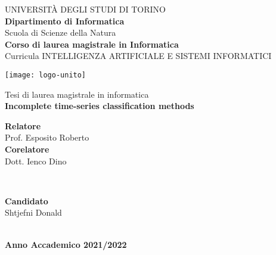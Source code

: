 \begin{titlepage}
  \begin{center}
      {\large \uppercase{Università degli studi di Torino}}\\[0.6cm]
      {\large \bf Dipartimento di Informatica}\\[0.6cm]
      {Scuola di Scienze della Natura}\\[0.6cm]
      {\large \bf Corso di laurea magistrale in Informatica}\\[0.5cm]
      {Curricula INTELLIGENZA ARTIFICIALE E SISTEMI INFORMATICI}\\[0.5cm]
      
      \vspace{0.1cm}
      \begin{center}
          \texttt{[image: logo-unito]}
      \end{center}
      \vspace{0.3cm}
      
      {Tesi di laurea magistrale in informatica}\\[1cm]
      {\huge \bf Incomplete time-series classification methods}\\[2.0cm]
      
     \begin{minipage}{0.4\textwidth}
         \begin{flushleft} \large
             \textbf{Relatore}\\
             {Prof. Esposito Roberto}\\[0.2cm]
             \textbf{Corelatore}\\
             {Dott. Ienco Dino}
         \end{flushleft}
     \end{minipage}
     ~
     \begin{minipage}{0.4\textwidth}
         \begin{flushright} \large
             \textbf{Candidato} \\
             {Shtjefni Donald} \\
         \end{flushright}
     \end{minipage}\\[1cm]
     {\bf Anno Accademico 2021/2022}
     \clearpage
  \end{center}
\end{titlepage}
